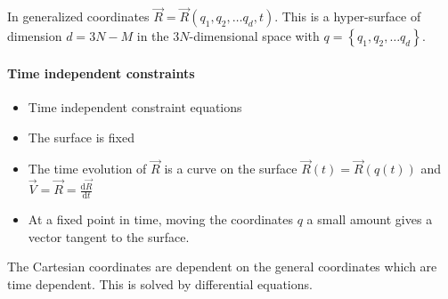 In generalized coordinates $\vec{R} = \vec{R}(q_1, q_2, \ldots  q_d, t)$. This is a hyper-surface of dimension $d = 3N - M$ in the $3N$-dimensional space with $q = \left\{q_1, q_2, \ldots  q_d\right\}$.

\paragraph{Time independent constraints}
\begin{itemize}
    \item Time independent constraint equations
    \item The surface is fixed
    \item The time evolution of $\vec{R}$ is a curve on the surface $\vec{R}(t) = \vec{R}(q(t))$ and $\vec{V} = \vec{R} = \frac{\mathrm{d}\vec{R}}{\mathrm{d}t}$
    \item At a fixed point in time, moving the coordinates $q$ a small amount gives a vector tangent to the surface. 
\end{itemize}

The Cartesian coordinates are dependent on the general coordinates which are time dependent. This is solved by differential equations. 
